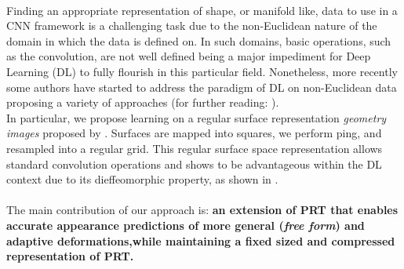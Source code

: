 \\
Finding an appropriate representation of shape, or manifold like, data to use in a CNN framework is a challenging task due to the non-Euclidean nature of the domain in which the data is defined on. In such domains, basic operations, such as the convolution, are not well defined being a major impediment for Deep Learning (DL) to fully flourish in this particular field. Nonetheless, more recently some authors have started to address the paradigm of DL on non-Euclidean data proposing a variety of approaches \cite{Masci2015ShapeNetCN, Geometric_deep_learning, CNN_on_Torus} (for further reading: \cite{GeoDeepLearning}). \\
In particular, we propose learning on a regular surface representation \textit{geometry images} proposed by \citep{gu2002geometry}. Surfaces are mapped into squares, we perform ping, and resampled into a regular grid. This regular surface space representation allows standard convolution operations and shows to be advantageous within the DL context due to its dieffeomorphic property, as shown in \cite{sinha2016deep}. 
\\
\\
The main contribution of our approach is: \textbf{an extension of PRT that enables accurate appearance predictions of more general (\textit{free form}) and adaptive deformations,while maintaining a fixed sized and compressed representation of PRT. }

